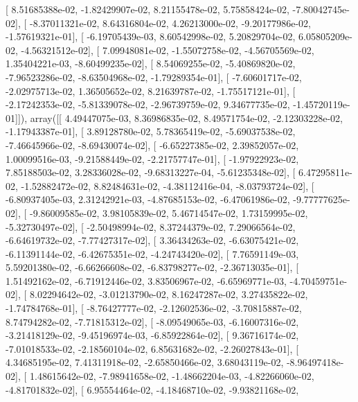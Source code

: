 \documentclass{article}
\begin{document}
       [  8.51685388e-02,  -1.82429907e-02,   8.21155478e-02,
          5.75858424e-02,  -7.80042745e-02],
       [ -8.37011321e-02,   8.64316804e-02,   4.26213000e-02,
         -9.20177986e-02,  -1.57619321e-01],
       [ -6.19705439e-03,   8.60542998e-02,   5.20829704e-02,
          6.05805209e-02,  -4.56321512e-02],
       [  7.09948081e-02,  -1.55072758e-02,  -4.56705569e-02,
          1.35404221e-03,  -8.60499235e-02],
       [  8.54069255e-02,  -5.40869820e-02,  -7.96523286e-02,
         -8.63504968e-02,  -1.79289354e-01],
       [ -7.60601717e-02,  -2.02975713e-02,   1.36505652e-02,
          8.21639787e-02,  -1.75517121e-01],
       [ -2.17242353e-02,  -5.81339078e-02,  -2.96739759e-02,
          9.34677735e-02,  -1.45720119e-01]]), array([[  4.49447075e-03,   8.36986835e-02,   8.49571754e-02,
         -2.12303228e-02,  -1.17943387e-01],
       [  3.89128780e-02,   5.78365419e-02,  -5.69037538e-02,
         -7.46645966e-02,  -8.69430074e-02],
       [ -6.65227385e-02,   2.39852057e-02,   1.00099516e-03,
         -9.21588449e-02,  -2.21757747e-01],
       [ -1.97922923e-02,   7.85188503e-02,   3.28336028e-02,
         -9.68313227e-04,  -5.61235348e-02],
       [  6.47295811e-02,  -1.52882472e-02,   8.82484631e-02,
         -4.38112416e-04,  -8.03793724e-02],
       [ -6.80937405e-03,   2.31242921e-03,  -4.87685153e-02,
         -6.47061986e-02,  -9.77777625e-02],
       [ -9.86009585e-02,   3.98105839e-02,   5.46714547e-02,
          1.73159995e-02,  -5.32730497e-02],
       [ -2.50498994e-02,   8.37244379e-02,   7.29066564e-02,
         -6.64619732e-02,  -7.77427317e-02],
       [  3.36434263e-02,  -6.63075421e-02,  -6.11391144e-02,
         -6.42675351e-02,  -4.24743420e-02],
       [  7.76591149e-03,   5.59201380e-02,  -6.66266608e-02,
         -6.83798277e-02,  -2.36713035e-01],
       [  1.51492162e-02,  -6.71912446e-02,   3.83506967e-02,
         -6.65969771e-03,  -4.70459751e-02],
       [  8.02294642e-02,  -3.01213790e-02,   8.16247287e-02,
          3.27435822e-02,  -1.74784768e-01],
       [ -8.76427777e-02,  -2.12602536e-02,  -3.70815887e-02,
          8.74794282e-02,  -7.71815312e-02],
       [ -8.09549065e-03,  -6.16007316e-02,  -3.21418129e-02,
         -9.45196974e-03,  -6.85922864e-02],
       [  9.36716174e-02,  -7.01018533e-02,  -2.18560104e-02,
          6.85631682e-02,  -2.26027843e-01],
       [  4.34685195e-02,   7.41311918e-02,  -2.65850466e-02,
          3.68043119e-02,  -8.96497418e-02],
       [  1.48615642e-02,  -7.98941658e-02,  -1.48662204e-03,
         -4.82266060e-02,  -4.81701832e-02],
       [  6.95554464e-02,  -4.18468710e-02,  -9.93821168e-02,
\end{document}
